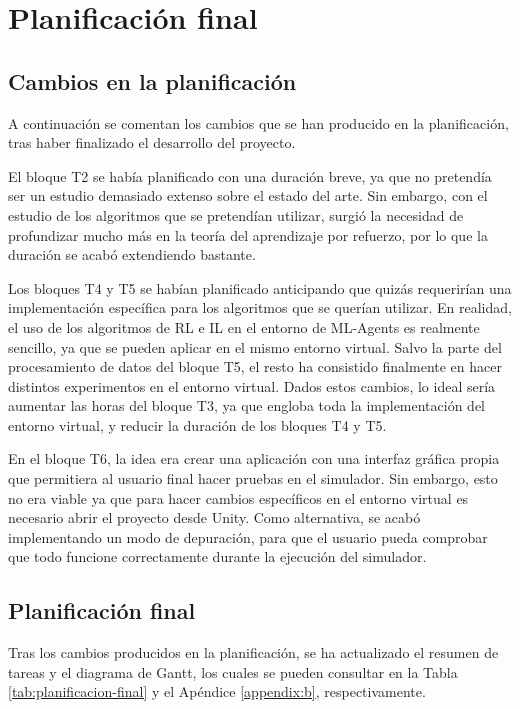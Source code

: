 \chapter{Planificación final}

\section{Cambios en la planificación}

A continuación se comentan los cambios que se han producido en la planificación, tras haber finalizado el desarrollo del proyecto.

El bloque T2 se había planificado con una duración breve, ya que no pretendía ser un estudio demasiado extenso sobre el estado del arte. Sin embargo, con el estudio de los algoritmos que se pretendían utilizar, surgió la necesidad de profundizar mucho más en la teoría del aprendizaje por refuerzo, por lo que la duración se acabó extendiendo bastante.

Los bloques T4 y T5 se habían planificado anticipando que quizás requerirían una implementación específica para los algoritmos que se querían utilizar. En realidad, el uso de los algoritmos de RL e IL en el entorno de ML-Agents es realmente sencillo, ya que se pueden aplicar en el mismo entorno virtual. Salvo la parte del procesamiento de datos del bloque T5, el resto ha consistido finalmente en hacer distintos experimentos en el entorno virtual. Dados estos cambios, lo ideal sería aumentar las horas del bloque T3, ya que engloba toda la implementación del entorno virtual, y reducir la duración de los bloques T4 y T5.

En el bloque T6, la idea era crear una aplicación con una interfaz gráfica propia que permitiera al usuario final hacer pruebas en el simulador. Sin embargo, esto no era viable ya que para hacer cambios específicos en el entorno virtual es necesario abrir el proyecto desde Unity. Como alternativa, se acabó implementando un modo de depuración, para que el usuario pueda comprobar que todo funcione correctamente durante la ejecución del simulador.

\section{Planificación final}

Tras los cambios producidos en la planificación, se ha actualizado el resumen de tareas y el diagrama de Gantt, los cuales se pueden consultar en la Tabla \ref{tab:planificacion-final} y el Apéndice \ref{appendix:b}, respectivamente.

